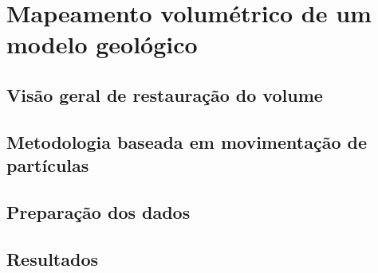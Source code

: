 
\chapter{Mapeamento volumétrico de um modelo geológico}

\section{Visão geral de restauração do volume}

\section{Metodologia baseada em movimentação de partículas}

\section{Preparação dos dados}

\section{Resultados}

